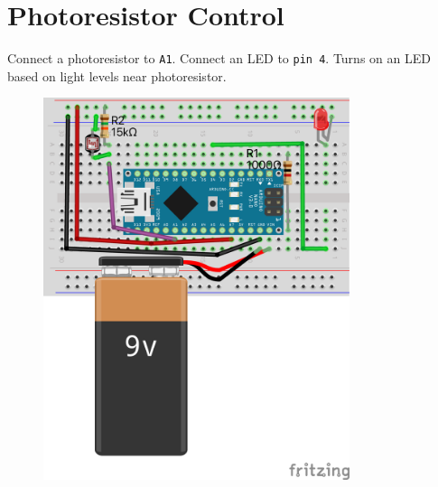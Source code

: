 \documentclass{article}
\begin{document}
\section*{Photoresistor Control}
\begin{minipage}{\textwidth}
Connect a photoresistor to \texttt{A1}. Connect an LED to \texttt{pin 4}. Turns on an LED based on light levels near photoresistor.
\end{minipage}
\begin{figure}[h!]
\centering
\includegraphics[width=0.8\textwidth]{photoresistor_nano_bb.png}
\end{figure}
\newpage
\end{document}
